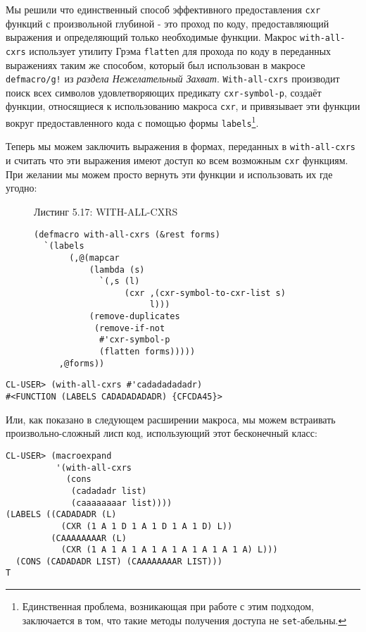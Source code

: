 Мы решили что единственный способ эффективного предоставления \verb"cxr" функций с произвольной глубиной - это проход по коду, предоставляющий выражения и определяющий только необходимые функции. Макрос \verb"with-all-cxrs" использует утилиту Грэма \verb"flatten" для прохода по коду в переданных выражениях таким же способом, который был использован в макросе \verb"defmacro/g!" из \emph{раздела Нежелательный Захват}. \verb"With-all-cxrs" производит поиск всех символов удовлетворяющих предикату \verb"cxr-symbol-p", создаёт функции, относящиеся к использованию макроса \verb"cxr", и привязывает эти функции вокруг предоставленного кода с помощью формы \verb"labels"\footnote{Единственная проблема, возникающая при работе с этим подходом, заключается в том, что такие методы получения доступа не \verb"set"-абельны.}.

Теперь мы можем заключить выражения в формах, переданных в \verb"with-all-cxrs" и считать что эти выражения имеют доступ ко всем возможным \verb"cxr" функциям. При желании мы можем просто вернуть эти функции и использовать их где угодно:

\begin{figure}Листинг 5.17: WITH-ALL-CXRS\label{listing_5.17}
\listbegin
\begin{verbatim}
(defmacro with-all-cxrs (&rest forms)
  `(labels
       (,@(mapcar
           (lambda (s)
             `(,s (l)
                  (cxr ,(cxr-symbol-to-cxr-list s)
                       l)))
           (remove-duplicates
            (remove-if-not
             #'cxr-symbol-p
             (flatten forms)))))
     ,@forms))
\end{verbatim}
\listend
\end{figure}

\begin{verbatim}
CL-USER> (with-all-cxrs #'cadadadadadr)
#<FUNCTION (LABELS CADADADADADR) {CFCDA45}>
\end{verbatim}

Или, как показано в следующем расширении макроса, мы можем встраивать произвольно-сложный лисп код, использующий этот бесконечный класс:

\begin{verbatim}
CL-USER> (macroexpand
          '(with-all-cxrs
            (cons
             (cadadadr list)
             (caaaaaaaar list))))
(LABELS ((CADADADR (L)
           (CXR (1 A 1 D 1 A 1 D 1 A 1 D) L))
         (CAAAAAAAAR (L)
           (CXR (1 A 1 A 1 A 1 A 1 A 1 A 1 A 1 A) L)))
  (CONS (CADADADR LIST) (CAAAAAAAAR LIST)))
T
\end{verbatim}

